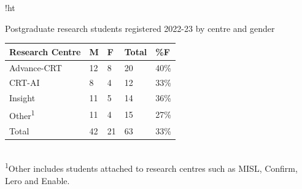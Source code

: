 
\begin{tabbox}{!ht}
\caption{Postgraduate research students registered 2022-23
by centre and gender}
\label{tab:phdregistrations2223}
\footnotesize 



\begin{tabular}{p{3.4cm}
                R{1cm}
                C{1.2cm}           
                C{1.3cm}
                C{1cm}
                }
\toprule                 
\textmd{Research Centre}&
\textmd{M}&
\textmd{F}&
\textmd{Total}&
\textmd{\%F}\\ 
\midrule 
Advance-CRT&
12& 8& 20& 40\%\\
\hdashline
CRT-AI&
8& 4& 12& 33\%\\
\hdashline
Insight&
11& 5& 14& 36\%\\
\hdashline
Other\textsuperscript{1}&
11& 4& 15& 27\%\\
\midrule 

Total&
42& 21& 63& 33\%\\

\bottomrule 
\end{tabular}
\vspace{2mm}\\
{
\sffamily
\textsuperscript{1}Other includes students attached to research centres such as 
MISL, Confirm, Lero and Enable.
}

\end{tabbox}


